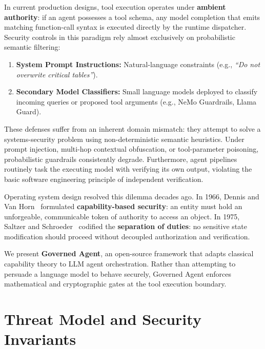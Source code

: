 \documentclass[11pt,a4paper]{article}
\begin{document}
In current production designs, tool execution operates under \textbf{ambient authority}: if an agent possesses a tool schema, any model completion that emits matching function-call syntax is executed directly by the runtime dispatcher. Security controls in this paradigm rely almost exclusively on probabilistic semantic filtering:
\begin{enumerate}
    \item \textbf{System Prompt Instructions:} Natural-language constraints (e.g., \emph{``Do not overwrite critical tables''}).
    \item \textbf{Secondary Model Classifiers:} Small language models deployed to classify incoming queries or proposed tool arguments (e.g., NeMo Guardrails, Llama Guard).
\end{enumerate}

These defenses suffer from an inherent domain mismatch: they attempt to solve a systems-security problem using non-deterministic semantic heuristics. Under prompt injection, multi-hop contextual obfuscation, or tool-parameter poisoning, probabilistic guardrails consistently degrade. Furthermore, agent pipelines routinely task the executing model with verifying its own output, violating the basic software engineering principle of independent verification.

Operating system design resolved this dilemma decades ago. In 1966, Dennis and Van Horn~\cite{dennis1966} formulated \textbf{capability-based security}: an entity must hold an unforgeable, communicable token of authority to access an object. In 1975, Saltzer and Schroeder~\cite{saltzer1975} codified the \textbf{separation of duties}: no sensitive state modification should proceed without decoupled authorization and verification.

We present \textbf{Governed Agent}, an open-source framework that adapts classical capability theory to LLM agent orchestration. Rather than attempting to persuade a language model to behave securely, Governed Agent enforces mathematical and cryptographic gates at the tool execution boundary.

\section{Threat Model and Security Invariants}
\end{document}
